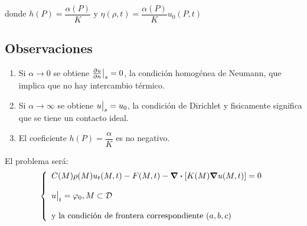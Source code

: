 \documentclass[../main]{subfiles}
\begin{document}
\begin{enumerate}
\begin{itemize}
\begin{minipage}{0.5\textwidth}
        \end{minipage}\\[0.5cm]
        donde $h(P)=\dfrac{\alpha(P)}{K}$ y $\eta(\rho,t)=\dfrac{\alpha(P)}{K}u_0(P,t)$
        \end{itemize}
        \subsection*{Observaciones}
        \begin{enumerate}
            \item Si $\alpha \rightarrow 0$ se obtiene $\pdv{u}{n}\big{|}_s=0$, la condición homogénea de Neumann, que implica que no hay intercambio térmico.
            \item Si $\alpha \rightarrow \infty$ se obtiene $u\big{|}_s=u_0$, la condición de Dirichlet y fisicamente significa que se tiene un contacto ideal.
            \item El coeficiente $h(P)=\dfrac{\alpha}{K}$ es no negativo.
        \end{enumerate}
        El problema será:
        \begin{equation*}
            \left\{ \begin{array}{ll}
             C(M)\rho(M)u_t(M,t)-F(M,t)-\div{[K(M)\grad{u(M,t)}]}=0\\ \\
             u\big{|}_t=\varphi_0, M \subset \mathcal{D} \\ \\
             \text{y la condición de frontera correspondiente } (a,b,c)
             \end{array} \right. 
        \end{equation*}
\end{enumerate}
\end{document}
